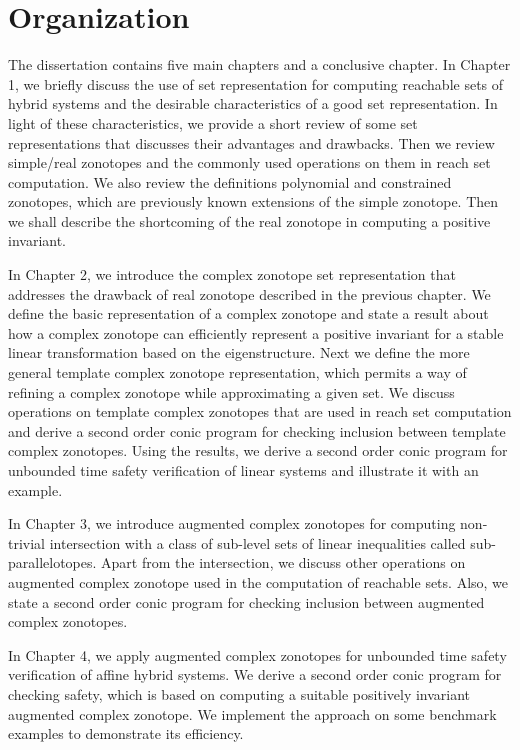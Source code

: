 \documentclass[11pt,a4paper,twoside,openright]{article}
\begin{document}
\section {Organization}
The dissertation contains five main chapters and a conclusive chapter.
In Chapter 1, we briefly discuss the use of set representation for
computing reachable sets of hybrid systems and the desirable
characteristics of a good set representation.  In light of these
characteristics, we provide a short review of some set representations
that discusses their advantages and drawbacks.  Then we review
simple/real zonotopes and the commonly used operations on them in
reach set computation.  We also review the definitions polynomial and
constrained zonotopes, which are previously known extensions of the
simple zonotope.  Then we shall describe the shortcoming of the real
zonotope in computing a positive invariant.

In Chapter 2, we introduce the complex zonotope set representation
that addresses the drawback of real zonotope described in the previous
chapter.  We define the basic representation of a complex zonotope and
state a result about how a complex zonotope can efficiently represent
a positive invariant for a stable linear transformation based on the
eigenstructure.  Next we define the more general template complex
zonotope representation, which permits a way of refining a complex
zonotope while approximating a given set.  We discuss operations on
template complex zonotopes that are used in reach set computation and
derive a second order conic program for checking inclusion between
template complex zonotopes.  Using the results, we derive a second
order conic program for unbounded time safety verification of linear
systems and illustrate it with an example.

In Chapter 3,
we introduce augmented complex zonotopes for computing non-trivial
intersection with a class of sub-level sets of linear inequalities
called sub-parallelotopes.  Apart from the intersection, we discuss
other operations on augmented complex zonotope used in the computation
of reachable sets.  Also, we state a second order conic program for
checking inclusion between augmented complex zonotopes.

In Chapter 4, we apply augmented complex zonotopes for unbounded time
safety verification of affine hybrid systems.  We derive a second
order conic program for checking safety, which is based on computing a
suitable positively invariant augmented complex zonotope.  We
implement the approach on some benchmark examples to demonstrate its
efficiency.
\end{document}
